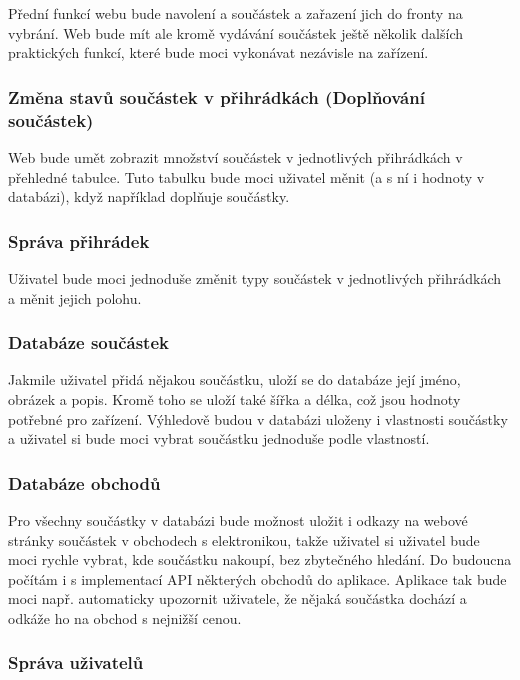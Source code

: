 \documentclass[12pt, a4paper, oneside]{article}
\begin{document}
Přední funkcí webu bude navolení a součástek a zařazení jich do fronty na vybrání.
Web bude mít ale kromě vydávání součástek ještě několik dalších praktických funkcí, které bude moci vykonávat nezávisle na zařízení.

\subsubsection{Změna stavů součástek v přihrádkách (Doplňování součástek)}

Web bude umět zobrazit množství součástek v jednotlivých přihrádkách v přehledné tabulce. Tuto tabulku bude moci uživatel měnit (a s ní i hodnoty v databázi), když například doplňuje součástky.

\subsubsection{Správa přihrádek}

Uživatel bude moci jednoduše změnit typy součástek v jednotlivých přihrádkách a měnit jejich polohu.

\subsubsection{Databáze součástek}

Jakmile uživatel přidá nějakou součástku, uloží se do databáze její jméno, obrázek a popis. Kromě toho se uloží také šířka a délka, což jsou hodnoty potřebné pro zařízení.
Výhledově budou v databázi uloženy i vlastnosti součástky a uživatel si bude moci vybrat součástku jednoduše podle vlastností.

\subsubsection{Databáze obchodů}

Pro všechny součástky v databázi bude možnost uložit i odkazy na webové stránky součástek v obchodech s elektronikou, takže uživatel si uživatel bude moci rychle vybrat, kde součástku nakoupí, bez zbytečného hledání.
Do budoucna počítám i s implementací API některých obchodů do aplikace. Aplikace tak bude moci např. automaticky upozornit uživatele, že nějaká součástka dochází a odkáže ho na obchod s nejnižší cenou.

\subsubsection{Správa uživatelů}
\end{document}
